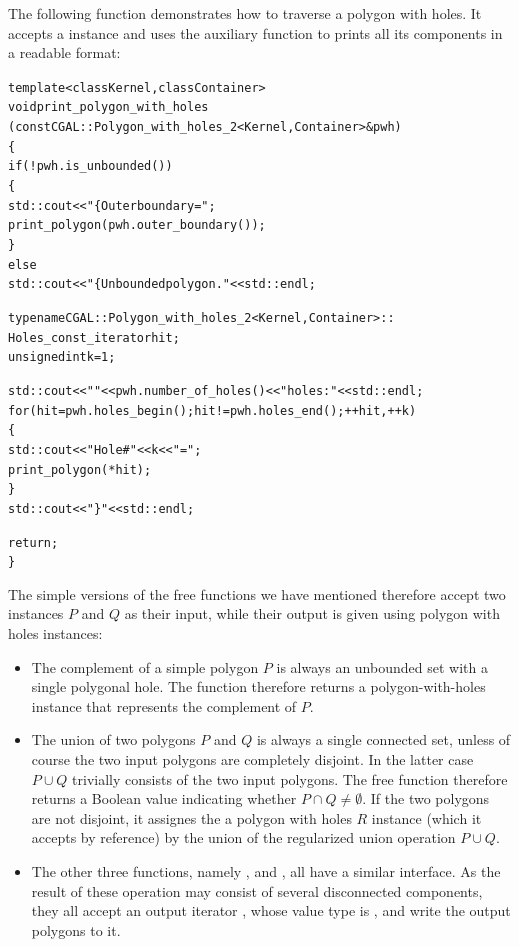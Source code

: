 The following function demonstrates how to traverse a polygon with holes.
It accepts a  instance and uses the auxiliary
function  to prints all its components in a readable
format:
\begin{alltt}
template<class Kernel, class Container>
void print_polygon_with_holes
    (const CGAL::Polygon_with_holes_2<Kernel, Container>& pwh)
\{
  if (! pwh.is_unbounded())
  \{
    std::cout << "\{ Outer boundary = "; 
    print_polygon (pwh.outer_boundary());
  \}
  else
    std::cout << "\{ Unbounded polygon." << std::endl;

  typename CGAL::Polygon_with_holes_2<Kernel,Container>::
                                             Holes_const_iterator  hit;
  unsigned int                                                   k = 1;

  std::cout << "  " << pwh.number_of_holes() << " holes:" << std::endl;
  for (hit = pwh.holes_begin(); hit != pwh.holes_end(); ++hit, ++k)
  \{
    std::cout << "    Hole #" << k << " = ";
    print_polygon (*hit);
  \}
  std::cout << " \}" << std::endl;

  return;
\}
\end{alltt}

The simple versions of the free functions we have mentioned therefore
accept two  instances $P$ and $Q$ as their input, while
their output is given using polygon with holes instances:
\begin{itemize}
\item The complement of a simple polygon $P$ is always an unbounded set
with a single polygonal hole. The function  therefore
returns a polygon-with-holes instance that represents the complement of $P$.
\item The union of two polygons $P$ and $Q$ is always a single connected
set, unless of course the two input polygons are completely disjoint. In
the latter case $P \cup Q$ trivially consists of the two input polygons.
The free function  therefore returns a Boolean value
indicating whether $P \cap Q \neq \emptyset$. If the two polygons are not
disjoint, it assignes the a polygon with holes $R$ instance (which it
accepts by reference) by the union of the regularized union operation
$P \cup Q$.
\item The other three functions, namely , 
 and , all
have a similar interface. As the result of these operation may consist of
several disconnected components, they all accept an output iterator ,
whose value type is , and write the
output polygons to it.
\end{itemize}

